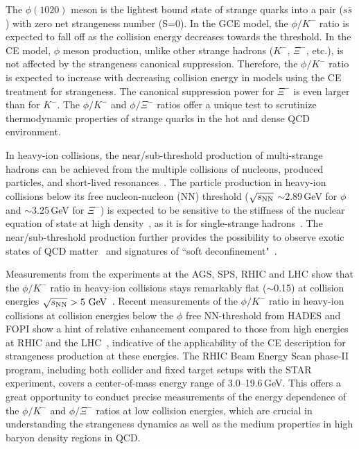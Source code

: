 \documentclass[%
 reprint,	
showpacs,
 amsmath,amssymb,
 aps,
 superscriptaddress,
]{revtex4-1}
\begin{document}
The $\phi(1020)$ meson is the lightest bound state of strange quarks into a pair ($s\bar{s}$) with zero net strangeness number (S=0). %
In the GCE model, the $\phi/K^-$ ratio is expected to fall off as the collision energy decreases towards the threshold. In the CE model, $\phi$ meson production, unlike other strange hadrons ($K^-$, $\Xi^-$, etc.), is not affected by the strangeness canonical suppression.
Therefore, the $\phi/K^-$ ratio is expected to increase with decreasing collision energy in models using the CE treatment for strangeness. The canonical suppression power for $\Xi^-$ is even larger than for $K^-$. The $\phi/K^-$ and $\phi/\Xi^-$ ratios offer a unique test to scrutinize thermodynamic properties of strange quarks in the hot and dense QCD environment.

In heavy-ion collisions, the near/sub-threshold production of multi-strange hadrons can be achieved from the multiple collisions of nucleons, produced particles, and short-lived resonances~\cite{ZEEB2004297}. The particle production in heavy-ion collisions below its free nucleon-nucleon (NN) threshold ($\sqrt{s_{\rm NN}}$ $\sim$2.89\,GeV for $\phi$ and $\sim$3.25\,GeV for $\Xi^-$) is expected to be sensitive to the stiffness of the nuclear equation of state at high density~\cite{yong2021double}, as it is for single-strange hadrons~\cite{KO.PhysRevLett.55.2661,FUCHS20061_kaons}. The near/sub-threshold production further provides the possibility
to observe exotic states of QCD matter~\cite{McLerran:2007qj} and signatures of ``soft deconfinement"~\cite{Fukushima:2020cmk}.
 
Measurements from the experiments at the AGS, SPS, RHIC and LHC show that the $\phi/K^-$ ratio in heavy-ion collisions stays remarkably flat ($\sim$0.15) at collision energies ${\sqrt{s_{\rm NN}} > \textup{5 GeV}}$~\cite{E917_phi,NA49_phi,star_bes_strangeness}. Recent measurements of the $\phi/K^-$ ratio in heavy-ion collisions at collision energies below the $\phi$ free NN-threshold from HADES and FOPI show a hint of relative enhancement compared to those from high energies at RHIC and the LHC~\cite{FOPI_phi_AlAl,FOPI_phi_NiNi,HADES_phi_ArKCl,HADES_phi_AuAu}, indicative of the applicability of the CE description for strangeness production at these energies. 
The RHIC Beam Energy Scan phase-II program, including both collider and fixed target setups with the STAR experiment, covers a center-of-mass energy range of 3.0--19.6\,GeV. This offers a great opportunity to conduct precise measurements of the energy dependence of the $\phi/K^-$ and $\phi/\Xi^-$ ratios at low collision energies, which are crucial in understanding the strangeness dynamics as well as the medium properties in high baryon density regions in QCD.
\end{document}
